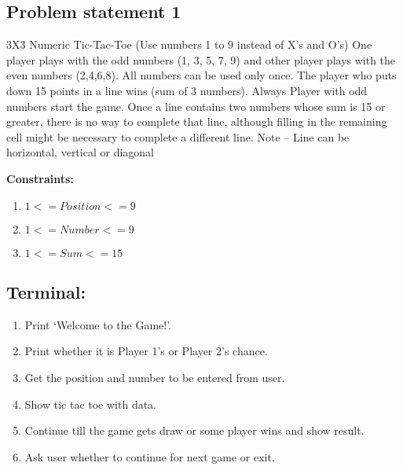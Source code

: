 \documentclass[12pt]{article}
\begin{document}
  
\newpage
\tableofcontents
\pagebreak
\begin{flushleft}


\section{ Problem statement 1}

\end{flushleft}
\begin{flushleft}
3X3 Numeric Tic-Tac-Toe (Use numbers 1 to 9 instead of X’s and O’s)
One player plays with the odd numbers (1, 3, 5, 7, 9) and other player plays with the even numbers (2,4,6,8). All numbers can be used only once. The player who puts down 15 points in a line wins (sum of 3 numbers). Always Player with odd numbers start the game. Once a line contains two numbers whose sum is 15 or greater, there is no way to complete that line, although filling in the remaining cell might be necessary to complete a different line.
Note – Line can be horizontal, vertical or diagonal

\textbf{Constraints:}
\begin{enumerate}
\item $ 1<=Position<=9$
\item $ 1<=Number<=9 $
\item $1<=Sum<=15$

\end{enumerate}




\end{flushleft}

\begin{flushleft}


\subsection{Terminal:}

\begin{enumerate}

\item Print ‘Welcome to the Game!’.
\item Print whether it is Player 1’s or Player 2’s chance.
\item Get the position and number to be entered from user.
\item Show tic tac toe with data.
\item Continue till the game gets draw or some player wins and show result.
\item Ask user whether to continue for next game or exit.



\end{enumerate}


\end{flushleft}
\end{document}
